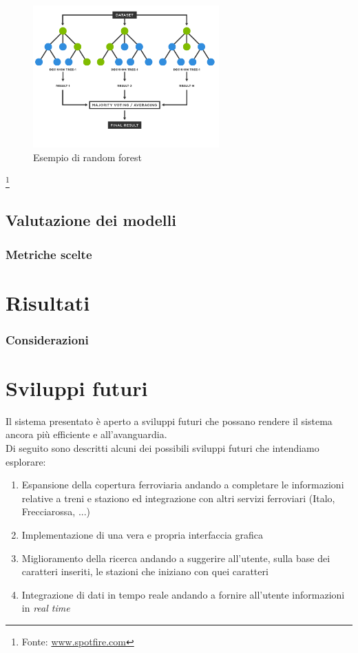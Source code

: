 \documentclass[italian,12pt,a4paper]{article}
\begin{document}
	\begin{figure}[!h]
		\centering
		\includegraphics[width=270px]{img/random-forest-diagram}
		\caption{Esempio di random forest}
	\end{figure}
	

		\footnote{Fonte: \href{https://www.spotfire.com/glossary/what-is-a-random-forest}{www.spotfire.com}}

	
	
	\subsection{Valutazione dei modelli}

	
	\subsubsection{Metriche scelte}


	\section{Risultati}


	
	\subsubsection{Considerazioni}
	
	\section{Sviluppi futuri}
	Il sistema presentato è aperto a sviluppi futuri che possano rendere il sistema ancora più efficiente e all'avanguardia. \\
	Di seguito sono descritti alcuni dei possibili sviluppi futuri che intendiamo esplorare:
	
	\begin{enumerate}
		\item Espansione della copertura ferroviaria andando a completare le informazioni relative a treni e staziono ed integrazione con altri servizi ferroviari (Italo, Frecciarossa, ...)
		\item Implementazione di una vera e propria interfaccia grafica
		\item Miglioramento della ricerca andando a suggerire all'utente, sulla base dei caratteri inseriti, le stazioni che iniziano con quei caratteri
		\item Integrazione di dati in tempo reale andando a fornire all'utente informazioni in \textit{real time}

	\end{enumerate}
	\printbibliography
	
\end{document}

